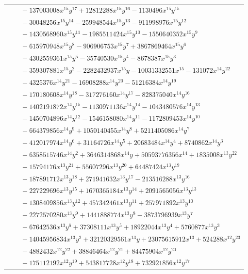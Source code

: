\documentclass[11pt]{article}
\begin{document}
\begin{longtable}{@{}ll@{}}
 & $\quad -137003008x^{15}y^{17}+12812288x^{15}y^{16}-1130496x^{15}y^{15}$\\
 & $\quad +30048256x^{15}y^{14}-259948544x^{15}y^{13}-911998976x^{15}y^{12}$\\
 & $\quad -1430568960x^{15}y^{11}-1985511424x^{15}y^{10}-1550640352x^{15}y^{9}$\\
 & $\quad -615970948x^{15}y^{8}-906906753x^{15}y^{7}+3867869464x^{15}y^{6}$\\
 & $\quad +4302559361x^{15}y^{5}-35740530x^{15}y^{4}-8678387x^{15}y^{3}$\\
 & $\quad +359307881x^{15}y^{2}-2282432937x^{15}y-10031332551x^{15}-131072x^{14}y^{22}$\\
 & $\quad -4325376x^{14}y^{21}-16908288x^{14}y^{20}-51216384x^{14}y^{19}$\\
 & $\quad -170180608x^{14}y^{18}-317276160x^{14}y^{17}-828375040x^{14}y^{16}$\\
 & $\quad -1402191872x^{14}y^{15}-1130971136x^{14}y^{14}-1043480576x^{14}y^{13}$\\
 & $\quad -1450704896x^{14}y^{12}-1546158080x^{14}y^{11}-1172809453x^{14}y^{10}$\\
 & $\quad -664379856x^{14}y^{9}+1050140455x^{14}y^{8}+5211405086x^{14}y^{7}$\\
 & $\quad +412017974x^{14}y^{6}+31164726x^{14}y^{5}+20683484x^{14}y^{4}+8740862x^{14}y^{3}$\\
 & $\quad +6358515746x^{14}y^{2}+3646314868x^{14}y+50593776356x^{14}+1835008x^{13}y^{22}$\\
 & $\quad +15794176x^{13}y^{21}+55607296x^{13}y^{20}+64487424x^{13}y^{19}$\\
 & $\quad +187891712x^{13}y^{18}+271941632x^{13}y^{17}-213516288x^{13}y^{16}$\\
 & $\quad +227229696x^{13}y^{15}+1670365184x^{13}y^{14}+2091565056x^{13}y^{13}$\\
 & $\quad +1308409856x^{13}y^{12}+457342461x^{13}y^{11}+257971892x^{13}y^{10}$\\
 & $\quad +2272570280x^{13}y^{9}+1441888774x^{13}y^{8}-3873796939x^{13}y^{7}$\\
 & $\quad +67642536x^{13}y^{6}+37308111x^{13}y^{5}+18922044x^{13}y^{4}+5760877x^{13}y^{3}$\\
 & $\quad +14045956834x^{13}y^{2}+32120329561x^{13}y+23075615912x^{13}+524288x^{12}y^{23}$\\
 & $\quad +4882432x^{12}y^{22}+38846464x^{12}y^{21}+84475904x^{12}y^{20}$\\
 & $\quad +175112192x^{12}y^{19}+543817728x^{12}y^{18}+732921856x^{12}y^{17}$\\

\end{longtable}
\end{document}
